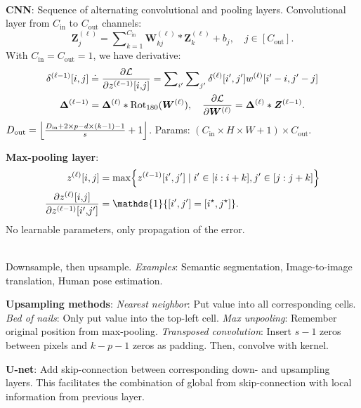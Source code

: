 \documentclass{article}
\newcommand{\lft}{\mathopen{}\mathclose\bgroup\left}
\newcommand{\rgt}{\aftergroup\egroup\right}
\newcommand{\mat}[1]{\bm{#1}}
\newenvironment{topic}[1]
{\textbf{\sffamily \colorbox{black}{\rlap{\textbf{\textcolor{white}{#1}}}\hspace{\linewidth}\hspace{-2\fboxsep}}} \\ \vspace{0.2cm}}
{}
\begin{document}
\begin{multicols*}{2}
\begin{topic}{Convolutional neural networks}
        \textbf{CNN}: Sequence of alternating convolutional and pooling layers. Convolutional layer from $C_{\mathrm{in}}$ to $C_{\mathrm{out}}$ channels: \[
            \mat{Z}_j^{(\ell)} = \sum\nolimits_{k=1}^{C_{\mathrm{in}}} \mat{W}_{kj}^{(\ell)} * \mat{Z}_k^{(\ell)} + b_j, \quad j \in [C_{\mathrm{out}}].
        \]
        With $C_{\mathrm{in}} = C_{\mathrm{out}} = 1$, we have derivative:
        \begin{gather*}
            \delta^{(\ell-1)}[i,j] \doteq \pdv{\mathcal{L}}{z^{(\ell-1)}[i{,}j]} = \sum\nolimits_{i'} \sum\nolimits_{j'} \delta^{(\ell)}[i',j'] w^{(\ell)}[i'-i,j'-j] \\
            \mat{\Delta}^{(\ell-1)} = \mat{\Delta}^{(\ell)} * \mathrm{Rot}_{180}(\mat{W}^{(\ell)}), \quad \pdv{\mathcal{L}}{\mat{W}^{(\ell)}} = \mat{\Delta}^{(\ell)} * \mat{Z}^{(\ell - 1)}.
        \end{gather*}
        $D_{\mathrm{out}} = \lft\lfloor \frac{D_{\mathrm{in}} + 2 \times p - d \times (k - 1) - 1}{s} + 1 \rgt\rfloor$.
        Params: $(C_{\mathrm{in}} \times H \times W + 1) \times C_{\mathrm{out}}$.

        \textbf{Max-pooling layer}:
        \begin{align*}
            z^{(\ell)}[i,j]                                & = \max \lft\{ z^{(\ell-1)}[i',j'] \mid i' \in [i : i + k], j' \in [j : j+k] \rgt\} \\
            \pdv{z^{(\ell)}[i{,}j]}{z^{(\ell-1)}[i'{,}j']} & = \mathds{1}\{ [i',j'] = [i^\star,j^\star] \}.
        \end{align*}
        No learnable parameters, only propagation of the error.

    \end{topic}

    \begin{topic}{Fully convolutional neural networks}
        Downsample, then upsample. \textit{Examples}: Semantic segmentation, Image-to-image translation, Human pose estimation.

        \textbf{Upsampling methods}: \textit{Nearest neighbor}: Put value into all corresponding cells.
        \textit{Bed of nails}: Only put value into the top-left cell.
        \textit{Max unpooling}: Remember original position from max-pooling.
        \textit{Transposed convolution}: Insert $s-1$ zeros between pixels and $k-p-1$ zeros as padding. Then, convolve with kernel.

        \textbf{U-net}: Add skip-connection between corresponding down- and upsampling layers. This facilitates the
        combination of global from skip-connection with local information from previous layer.


\end{topic}
\end{multicols*}
\end{document}
